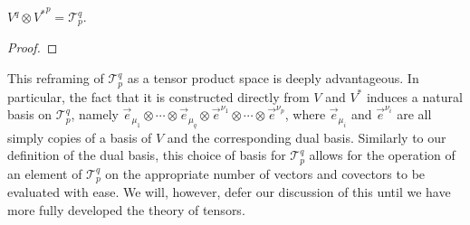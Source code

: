 \documentclass[../main.tex]{subfiles}
\begin{document}
    \begin{theorem}
        \(V^{q}\otimes{}{V^{*}}^{p}=\mathcal{T}_{p}^{q}\).
        \begin{proof}
        \end{proof}
    \end{theorem}
    This reframing of \(\mathcal{T}_{p}^{q}\) as a tensor product space is deeply advantageous. In particular, the fact that it is constructed directly from \(V\) and \(V^{*}\) induces a natural basis on \(\mathcal{T}_{p}^{q}\), namely \(\vec{e}_{\mu_{1}}\otimes\cdots\otimes\vec{e}_{\mu_{q}}\otimes\vec{e}^{\nu_{1}}\otimes\cdots\otimes\vec{e}^{\nu_{p}}\), where \(\vec{e}_{\mu_{i}}\) and \(\vec{e}^{\nu_{i}}\) are all simply copies of a basis of \(V\) and the corresponding dual basis. Similarly to our definition of the dual basis, this choice of basis for \(\mathcal{T}_{p}^{q}\) allows for the operation of an element of \(\mathcal{T}_{p}^{q}\) on the appropriate number of vectors and covectors to be evaluated with ease. We will, however, defer our discussion of this until we have more fully developed the theory of tensors.
\end{document}
